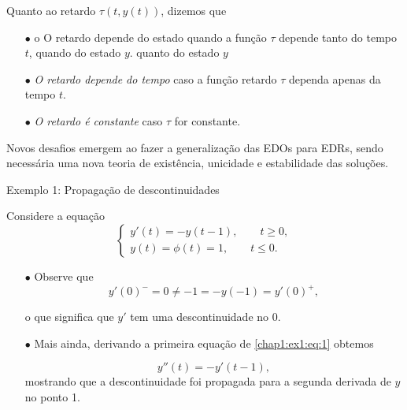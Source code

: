 \documentclass{beamer}
\theoremstyle{plain}
\theoremstyle{definition}
\begin{document}

\begin{frame}
    Quanto ao retardo $\tau(t, y(t))$, dizemos que
     \begin{itemize}
         \item[$\bullet$] {\color{red}o} O retardo depende do estado quando a função $\tau$ depende tanto do tempo $t$, quando do estado $y$.
         quanto do estado $y$
         \item[$\bullet$] \textit{O retardo depende do tempo} caso a função retardo $\tau$ dependa apenas da tempo $t$.
         \item[$\bullet$] \textit{O retardo é constante} caso $\tau$ for constante.
     \end{itemize}
     
    Novos desafios emergem ao fazer a generalização das EDOs para EDRs, sendo necessária uma nova teoria de existência, unicidade e estabilidade das soluções.

\end{frame}



\begin{frame}{Exemplo 1: Propagação de descontinuidades}

    \small
        Considere a equação
        \begin{equation}
            \begin{cases}
                y'(t) = -y(t - 1), \qquad t \geq 0, \\
                y(t) = \phi(t) = 1, \qquad t \leq 0.
            \end{cases} 
            \label{chap1:ex1:eq:1}
        \end{equation}


        \begin{itemize}
            \item[$\bullet$] \noindent
                Observe que
                \[
                    y'(0)^- = 0 \neq -1 = -y(-1) = y'(0)^+,
                \]

                \noindent
                o que significa que $y'$ tem uma descontinuidade no 0. 

            \item[$\bullet$] Mais ainda, derivando a primeira equação de \eqref{chap1:ex1:eq:1} obtemos

                \noindent
                \begin{equation*}
                    y''(t) = - y'(t - 1) ,
                    \label{ex_intro1_eq1}
                \end{equation*}
                mostrando que a descontinuidade foi propagada para a segunda derivada de $y$ no ponto 1.  

        \end{itemize}

\end{frame}
\end{document}
